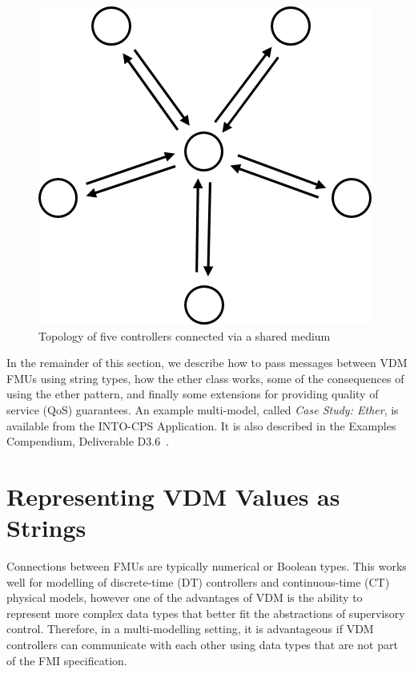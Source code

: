 \begin{figure}[hb]
\centering
\includegraphics[scale=0.4]{figures/bigraph2}
\caption{Topology of five controllers connected via a shared medium}
\label{fig:bigraph2}
\end{figure}

In the remainder of this section, we describe how to pass messages between VDM FMUs using string types, how the ether class works, some of the consequences of using the ether pattern, and finally some extensions for providing quality of service (QoS) guarantees. %
An example multi-model, called \emph{Case Study: Ether}, is available from the INTO-CPS Application. It is also described in the Examples Compendium, Deliverable D3.6~\cite{INTOCPSD3.6}.

\section{Representing VDM Values as Strings}

Connections between FMUs are typically numerical or Boolean types. This works well for modelling of discrete-time (DT) controllers and continuous-time (CT) physical models, however one of the advantages of VDM is the ability to represent more complex data types that better fit the abstractions of supervisory control. Therefore, in a multi-modelling setting, it is advantageous if VDM controllers can communicate with each other using data types that are not part of the FMI specification.

